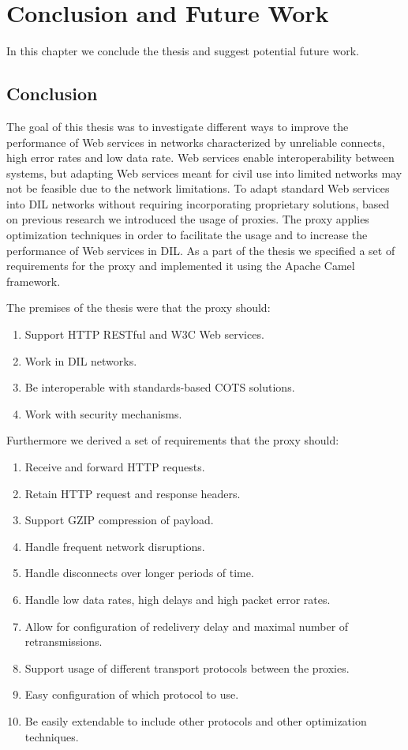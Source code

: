 \chapter{Conclusion and Future Work}
\label{chapter:conclusion}

In this chapter we conclude the thesis and suggest potential future work.

\section{Conclusion}

The goal of this thesis was to investigate different ways to improve the
performance of Web services in networks characterized by unreliable connects,
high error rates and low data rate. Web services enable interoperability between
systems, but adapting Web services meant for civil use into limited networks may
not be feasible due to the network limitations. To adapt standard Web services
into DIL networks without requiring incorporating proprietary solutions, based
on previous research we introduced the usage of proxies. The proxy applies
optimization techniques in order to facilitate the usage and to increase the
performance of Web services in DIL. As a part of the thesis we specified a set
of requirements for the proxy and implemented it using the Apache Camel
framework.

The premises of the thesis were that the proxy should:

\begin{enumerate}
    \item Support HTTP RESTful and W3C Web services.
    \item Work in DIL networks.
    \item Be interoperable with standards-based COTS solutions.
    \item Work with security mechanisms.
\end{enumerate}

Furthermore we derived a set of requirements that the proxy should:

\begin{enumerate}
    \item Receive and forward HTTP requests.
    \item Retain HTTP request and response headers.
    \item Support GZIP compression of payload.
    \item Handle frequent network disruptions.
    \item Handle disconnects over longer periods of time.
    \item Handle low data rates, high delays and high packet error rates.
    \item Allow for configuration of redelivery delay and maximal number of retransmissions.
    \item Support usage of different transport protocols between the proxies.
    \item Easy configuration of which protocol to use.
    \item Be easily extendable to include other protocols and other optimization techniques.
\end{enumerate}

